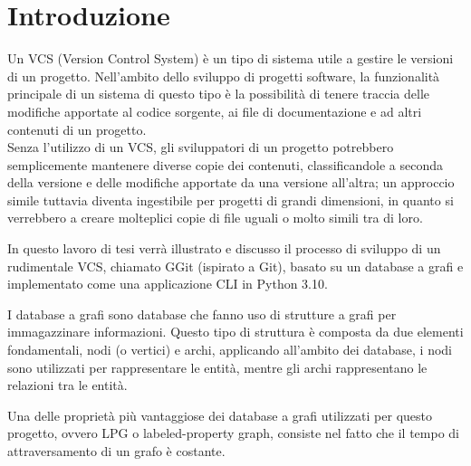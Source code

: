 \chapter*{Introduzione}
\label{chap:intro}
Un VCS (Version Control System) è un tipo di sistema utile a gestire le versioni di un progetto.
Nell'ambito dello sviluppo di progetti software, la funzionalità principale di un sistema di 
questo tipo è la possibilità di tenere traccia delle modifiche apportate al codice sorgente, ai file
di documentazione e ad altri contenuti di un progetto.\\
Senza l'utilizzo di un VCS, gli sviluppatori di un progetto potrebbero semplicemente mantenere diverse 
copie dei contenuti, classificandole a seconda della versione e delle modifiche apportate da una 
versione all'altra; un approccio simile tuttavia diventa ingestibile per progetti di grandi dimensioni,
in quanto si verrebbero a creare molteplici copie di file uguali o molto simili tra di loro.

In questo lavoro di tesi verrà illustrato e discusso il processo di sviluppo di un rudimentale VCS, 
chiamato GGit (ispirato a Git), basato su un database a grafi e implementato come una applicazione CLI
in Python 3.10.

I database a grafi sono database che fanno uso di strutture a grafi per immagazzinare informazioni.
Questo tipo di struttura è composta da due elementi fondamentali, nodi (o vertici) e archi, applicando
all'ambito dei database, i nodi sono utilizzati per rappresentare le entità, mentre gli archi
rappresentano le relazioni tra le entità.

Una delle proprietà più vantaggiose dei database a grafi utilizzati per questo progetto, ovvero 
LPG o labeled-property graph, consiste nel fatto che il tempo di attraversamento di un grafo 
è costante\cite{traversaltime}.